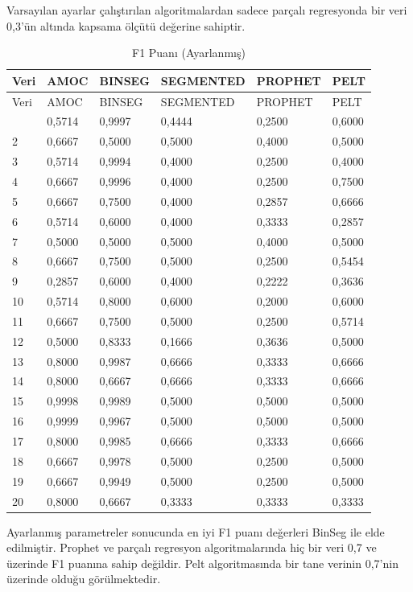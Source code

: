 \documentclass[12pt,twoside]{deuthesis}
\begin{document}
Varsayılan ayarlar çalıştırılan algoritmalardan sadece parçalı regresyonda bir veri 0,3'ün altında kapsama ölçütü değerine sahiptir.

\begin{longtable}[]{@{}llllll@{}}
\caption{\label{tab:nvar10} F1 Puanı (Ayarlanmış)}\tabularnewline
\toprule\noalign{}
Veri & AMOC & BINSEG & SEGMENTED & PROPHET & PELT \\
\midrule\noalign{}
\endfirsthead
\toprule\noalign{}
Veri & AMOC & BINSEG & SEGMENTED & PROPHET & PELT \\
\midrule\noalign{}
\endhead
\bottomrule\noalign{}
\endlastfoot
1 & 0,5714 & 0,9997 & 0,4444 & 0,2500 & 0,6000 \\
2 & 0,6667 & 0,5000 & 0,5000 & 0,4000 & 0,5000 \\
3 & 0,5714 & 0,9994 & 0,4000 & 0,2500 & 0,4000 \\
4 & 0,6667 & 0,9996 & 0,4000 & 0,2500 & 0,7500 \\
5 & 0,6667 & 0,7500 & 0,4000 & 0,2857 & 0,6666 \\
6 & 0,5714 & 0,6000 & 0,4000 & 0,3333 & 0,2857 \\
7 & 0,5000 & 0,5000 & 0,5000 & 0,4000 & 0,5000 \\
8 & 0,6667 & 0,7500 & 0,5000 & 0,2500 & 0,5454 \\
9 & 0,2857 & 0,6000 & 0,4000 & 0,2222 & 0,3636 \\
10 & 0,5714 & 0,8000 & 0,6000 & 0,2000 & 0,6000 \\
11 & 0,6667 & 0,7500 & 0,5000 & 0,2500 & 0,5714 \\
12 & 0,5000 & 0,8333 & 0,1666 & 0,3636 & 0,5000 \\
13 & 0,8000 & 0,9987 & 0,6666 & 0,3333 & 0,6666 \\
14 & 0,8000 & 0,6667 & 0,6666 & 0,3333 & 0,6666 \\
15 & 0,9998 & 0,9989 & 0,5000 & 0,5000 & 0,5000 \\
16 & 0,9999 & 0,9967 & 0,5000 & 0,5000 & 0,5000 \\
17 & 0,8000 & 0,9985 & 0,6666 & 0,3333 & 0,6666 \\
18 & 0,6667 & 0,9978 & 0,5000 & 0,2500 & 0,5000 \\
19 & 0,6667 & 0,9949 & 0,5000 & 0,2500 & 0,5000 \\
20 & 0,8000 & 0,6667 & 0,3333 & 0,3333 & 0,3333 \\
\end{longtable}

Ayarlanmış parametreler sonucunda en iyi F1 puanı değerleri BinSeg ile elde edilmiştir. Prophet ve parçalı regresyon algoritmalarında hiç bir veri 0,7 ve üzerinde F1 puanına sahip değildir. Pelt algoritmasında bir tane verinin 0,7'nin üzerinde olduğu görülmektedir.
\end{document}
